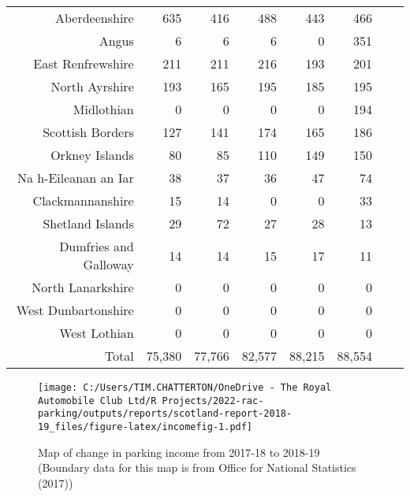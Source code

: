 \documentclass[
  12pt,
]{article}
\begin{document}
\begin{longtable}[t]{rrrrrrrr}
Aberdeenshire & 635 & 416 & 488 & 443 & 466 & \cellcolor{white}{  5.2\%} & \cellcolor{white}{ -7.4\%}\\
Angus & 6 & 6 & 6 & 0 & 351 & \cellcolor{white}{} & \cellcolor{white}{176.6\%}\\
East Renfrewshire & 211 & 211 & 216 & 193 & 201 & \cellcolor{white}{  4.1\%} & \cellcolor{white}{ -1.2\%}\\
North Ayrshire & 193 & 165 & 195 & 185 & 195 & \cellcolor{white}{  5.4\%} & \cellcolor{white}{  0.3\%}\\
Midlothian & 0 & 0 & 0 & 0 & 194 & \cellcolor{white}{} & \cellcolor{white}{}\\
Scottish Borders & 127 & 141 & 174 & 165 & 186 & \cellcolor{white}{ 12.7\%} & \cellcolor{white}{ 10.0\%}\\
Orkney Islands & 80 & 85 & 110 & 149 & 150 & \cellcolor{white}{  0.7\%} & \cellcolor{white}{ 17.0\%}\\
Na h-Eileanan an Iar & 38 & 37 & 36 & 47 & 74 & \cellcolor{white}{ 57.4\%} & \cellcolor{white}{ 18.1\%}\\
Clackmannanshire & 15 & 14 & 0 & 0 & 33 & \cellcolor{white}{} & \cellcolor{white}{ 21.8\%}\\
Shetland Islands & 29 & 72 & 27 & 28 & 13 & \cellcolor{white}{-53.6\%} & \cellcolor{white}{-18.2\%}\\
Dumfries and Galloway & 14 & 14 & 15 & 17 & 11 & \cellcolor{white}{-35.3\%} & \cellcolor{white}{ -5.9\%}\\
North Lanarkshire & 0 & 0 & 0 & 0 & 0 & \cellcolor{white}{  0.0\%} & \cellcolor{white}{  0.0\%}\\
West Dunbartonshire & 0 & 0 & 0 & 0 & 0 & \cellcolor{white}{  0.0\%} & \cellcolor{white}{  0.0\%}\\
West Lothian & 0 & 0 & 0 & 0 & 0 & \cellcolor{white}{  0.0\%} & \cellcolor{white}{  0.0\%}\\
\midrule
Total & 75,380 & 77,766 & 82,577 & 88,215 & 88,554 & \cellcolor{white}{  0.4\%} & \cellcolor{white}{  4.1\%}\\*
\end{longtable}
\endgroup{}

\begin{figure}
\centering
\texttt{[image: C:/Users/TIM.CHATTERTON/OneDrive - The Royal Automobile Club Ltd/R Projects/2022-rac-parking/outputs/reports/scotland-report-2018-19\_files/figure-latex/incomefig-1.pdf]}
\caption{\label{fig:incomefig}Map of change in parking income from 2017-18 to 2018-19 (Boundary data for this map is from Office for National Statistics (2017))}
\end{figure}
\end{document}
